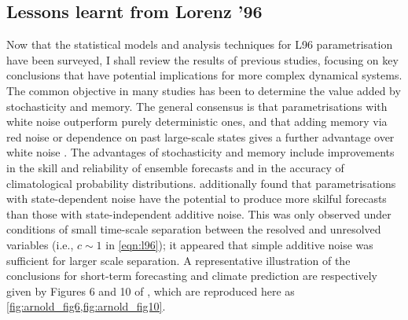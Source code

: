 \documentclass[titlepage,twoside]{article}
\numberwithin{equation}{section}
\begin{document}
\subsection{Lessons learnt from Lorenz '96}
Now that the statistical models and analysis techniques for L96 parametrisation
have been surveyed, I shall review the results of previous studies, focusing on
key conclusions that have potential implications for more complex dynamical
systems. The common objective in many studies has been to determine the value
added by stochasticity and memory. The general consensus is that
parametrisations with white noise outperform purely deterministic ones, and
that adding memory via red noise or dependence on past large-scale states gives
a further advantage over white noise
\parencite{wilks2005,arnold2013,gagne2020}. The advantages of stochasticity and
memory include improvements in the skill and reliability of ensemble forecasts
and in the accuracy of climatological probability distributions.
\textcite{arnold2013} additionally found that parametrisations with
state-dependent noise have the potential to produce more skilful forecasts than
those with state-independent additive noise. This was only observed under
conditions of small time-scale separation between the resolved and unresolved
variables (i.e., $c \sim 1$ in \cref{eqn:l96}); it appeared that simple
additive noise was sufficient for larger scale separation. A representative
illustration of the conclusions for short-term forecasting and climate
prediction are respectively given by Figures 6 and 10 of
\citeauthor{arnold2013}, which are reproduced here as
\cref{fig:arnold_fig6,fig:arnold_fig10}.
\end{document}
